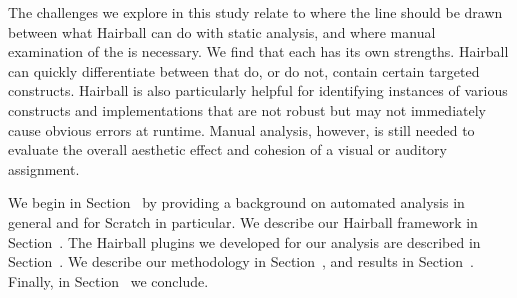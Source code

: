 The challenges we explore in this study relate to where the line should be
drawn between what Hairball can do with static analysis, and where manual
examination of the \sprogram{} is necessary.  We find that each has its own
strengths.  Hairball can quickly differentiate between  that do, or
do not, contain certain targeted constructs. Hairball is also particularly
helpful for identifying instances of various constructs and implementations
that are not robust but may not immediately cause obvious errors at runtime.
Manual analysis, however, is still needed to evaluate the overall aesthetic
effect and cohesion of a visual or auditory assignment.

We begin in Section~ by providing a background on
automated analysis in general and for Scratch in particular. We describe our
Hairball framework in Section~. The Hairball plugins we
developed for our analysis are described in Section~. We
describe our methodology in Section~, and results in
Section~. Finally, in Section~ we
conclude.
